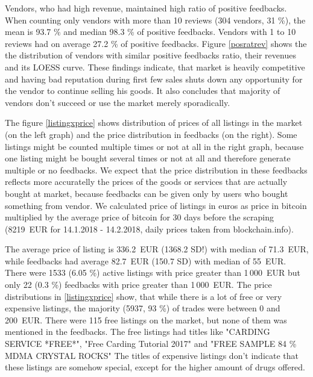 \documentclass[
  digital, %
  table,   %
  lof,     %
  lot,     %
  oneside
]{fithesis3}
\begin{document}
Vendors, who had high revenue, maintained high ratio of positive feedbacks.
When counting only vendors with more than 10 reviews (304 vendors, 31 \%),
the mean is 93.7 \% and median 98.3 \% of positive feedbacks.
Vendors with 1 to 10 reviews had on average 27.2 \% of positive feedbacks.
Figure \ref{posratrev} shows the the distribution of vendors with similar
positive feedbacks ratio, their revenues and its LOESS curve.
These findings indicate, that market is heavily competitive and
having bad reputation during first few sales shuts down any opportunity
for the vendor to continue selling his goods. It also concludes that majority of vendors don't succeed or use
the market merely sporadically.

The figure \ref{listingxprice} shows distribution of prices of all listings in
 the market (on the left graph) and the price distribution in feedbacks (on the right).
 Some listings might be counted multiple times or not at all
 in the right graph, because one listing might be bought several times or not at all
 and therefore generate multiple or no feedbacks. We expect that the price distribution
 in these feedbacks reflects more accuratelly the prices of the goods or services
 that are actually bought at market, because feedbacks can be given only by users who
 bought something from vendor. We calculated price of listings in euros as 
 price in bitcoin multiplied by the average price of bitcoin for 30 days before the scraping
 (8219~EUR for 14.1.2018 - 14.2.2018, daily prices taken from blockchain.info).
 
 The average price of listing is 336.2~EUR (1368.2 SD!) with median of 71.3~EUR,
 while feedbacks had average 82.7~EUR (150.7 SD) with median of 55~EUR.
  There were 1533 (6.05 \%) active listings with price greater than 1\,000~EUR but 
  only 22 (0.3 \%) feedbacks with price greater than 1\,000~EUR.
 The price distributions in \ref{listingxprice} show,
 that while there is a lot of free or very expensive listings,
 the majority (5937, 93 \%) of trades were between 0 and 200~EUR.
 There were 115 free listings on the market,
 but none of them was mentioned in the feedbacks.
 The free listings had titles like "CARDING SERVICE *FREE*",
  "Free Carding Tutorial 2017" and "FREE SAMPLE 84 \% MDMA CRYSTAL ROCKS"
 The titles of expensive listings don't indicate that 
these listings are somehow special, except for the higher amount of drugs offered.
\end{document}
